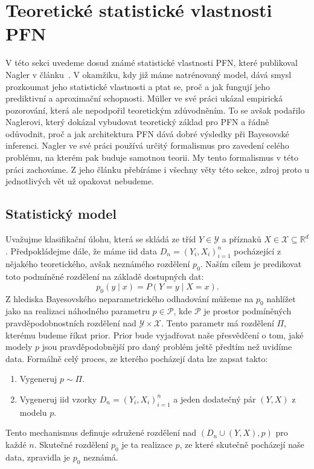\section{Teoretické statistické vlastnosti PFN}
\label{sec:pfn-teorie}
V této sekci uvedeme dosud známé statistické vlastnosti PFN, které publikoval Nagler v článku~\cite{nagler2023}.
V okamžiku, kdy již máme natrénovaný model, dává smysl prozkoumat jeho statistické vlastnosti a ptat se, proč a jak fungují jeho prediktivní a aproximační schopnosti.
Müller ve své práci ukázal empirická pozorování, která ale nepodpořil teoretickým zdůvodněním.
To se avšak podařilo Naglerovi, který dokázal vybudovat teoretický základ pro PFN a řádně odůvodnit, proč a jak architektura PFN dává dobré výsledky při Bayesovské inferenci.
Nagler ve své práci používá určitý formalismus pro zavedení celého problému, na kterém pak buduje samotnou teorii.
My tento formalismus v této práci zachováme.
Z jeho článku přebíráme i všechny věty této sekce, zdroj proto u jednotlivých vět už opakovat nebudeme.

\subsection{Statistický model}
\label{subsec:statisticky-model}
Uvažujme klasifikační úlohu, která se skládá ze tříd $Y \in \mathcal{Y}$ a příznaků $X \in \mathcal{X} \subseteq \mathbb{R}^d$.
Předpokládejme dále, že máme iid data $D_n = (Y_i, X_i)_{i=1}^n$ pocházející z nějakého teoretického, avšak neznámého rozdělení $p_0$.
Naším cílem je predikovat toto podmíněné rozdělení na základě dostupných dat: $$p_0(y \mid x) = P(Y = y \mid X = x).$$
Z hlediska Bayesovského neparametrického odhadování můžeme na $p_0$ nahlížet jako na realizaci náhodného parametru $p \in \mathcal{P}$, kde $\mathcal{P}$ je prostor podmíněných pravděpodobnostních rozdělení nad $\mathcal{Y} \times \mathcal{X}$.
Tento parametr má rozdělení $\Pi$, kterému budeme říkat prior.
Prior bude vyjadřovat naše přesvědčení o tom, jaké modely $p$ jsou pravděpodobnější pro daný problém ještě předtím než uvidíme data.
Formálně celý proces, ze kterého pocházejí data lze zapsat takto:
\begin{enumerate}
    \item Vygeneruj $p \sim \Pi$.
    \item Vygeneruj iid vzorky $D_n = (Y_i, X_i)_{i=1}^n$ a jeden dodatečný pár $(Y, X)$ z modelu $p$.
\label{generace_dat}
\end{enumerate}

Tento mechanismus definuje sdružené rozdělení nad $(D_n \cup (Y, X), p)$ pro každé $n$. 
Skutečné rozdělení $p_0$ je ta realizace $p$, ze které skutečně pocházejí naše data, zpravidla je $p_0$ neznámá.
\par   

